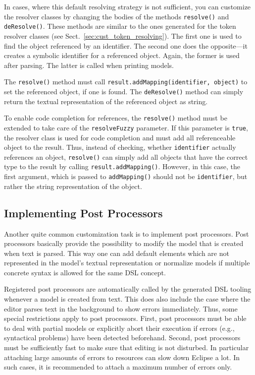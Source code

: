 In cases, where this default resolving strategy is not sufficient, you can
customize the resolver classes by changing the bodies of the methods
\texttt{resolve()} and \texttt{deResolve()}. These methods are similar to the
ones generated for the token resolver classes (see
Sect.~\ref{sec:cust_token_resolving}). The first one is used to find the object
referenced by an identifier. The second one does the opposite---it creates a
symbolic identifier for a referenced object. Again, the former is used after
parsing. The latter is called when printing models.

The \texttt{resolve()} method must call \texttt{result.addMapping(identifier,
object)} to set the referenced object, if one is found. The
\texttt{deResolve()} method can simply return the textual representation of the
referenced object as string.

To enable code completion for references, the \texttt{resolve()} method must be
extended to take care of the \texttt{resolveFuzzy} parameter. If this parameter is
\texttt{true}, the resolver class is used for code completion and must add all
referenceable object to the result. Thus, instead of checking, whether
\texttt{identifier} actually references an object, \texttt{resolve()} can
simply add all objects that have the correct type to the result by calling
\texttt{result.addMapping()}. However, in this case, the first argument, which
is passed to \texttt{addMapping()} should not be \texttt{identifier}, but rather
the string representation of the object.

\subsection{Implementing Post Processors}
\label{sec:cust_post_processors}

Another quite common customization task is to implement post processors. Post
processors basically provide the possibility to modify the model that is
created when text is parsed. This way one can add default elements which are not
represented in the model's textual representation or normalize models if
multiple concrete syntax is allowed for the same DSL concept.

Registered post processors are automatically called by the generated DSL tooling
whenever a model is created from text. This does also include the case where the
editor parses text in the background to show errors immediately. Thus, some
special restrictions apply to post processors. First, post
processors must be able to deal with partial models or explicitly abort their
execution if errors (e.g., syntactical problems) have been detected beforehand.
Second, post processors must be sufficiently fast to make sure that editing is
not disturbed. In particular attaching large amounts of errors to resources can
slow down Eclipse a lot. In such cases, it is recommended to attach a maximum
number of errors only.

